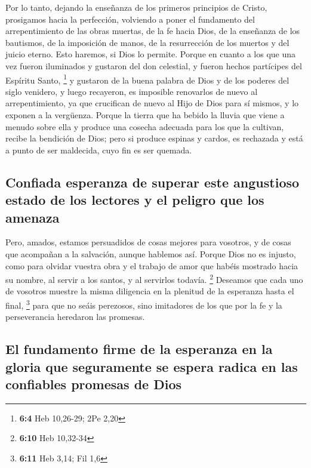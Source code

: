  Por lo tanto, dejando la enseñanza de los primeros
principios de Cristo, prosigamos hacia la perfección, volviendo a poner
el fundamento del arrepentimiento de las obras muertas, de la fe hacia
Dios,  de la enseñanza de los bautismos, de la imposición
de manos, de la resurrección de los muertos y del juicio eterno.
 Esto haremos, si Dios lo permite.  Porque
en cuanto a los que una vez fueron iluminados y gustaron del don
celestial, y fueron hechos partícipes del Espíritu Santo, \footnote{\textbf{6:4}
  Heb 10,26-29; 2Pe 2,20}  y gustaron de la buena palabra
de Dios y de los poderes del siglo venidero,  y luego
recayeron, es imposible renovarlos de nuevo al arrepentimiento, ya que
crucifican de nuevo al Hijo de Dios para sí mismos, y lo exponen a la
vergüenza.  Porque la tierra que ha bebido la lluvia que
viene a menudo sobre ella y produce una cosecha adecuada para los que la
cultivan, recibe la bendición de Dios;  pero si produce
espinas y cardos, es rechazada y está a punto de ser maldecida, cuyo fin
es ser quemada.

\hypertarget{confiada-esperanza-de-superar-este-angustioso-estado-de-los-lectores-y-el-peligro-que-los-amenaza}{%
\subsection{Confiada esperanza de superar este angustioso estado de los
lectores y el peligro que los
amenaza}\label{confiada-esperanza-de-superar-este-angustioso-estado-de-los-lectores-y-el-peligro-que-los-amenaza}}

 Pero, amados, estamos persuadidos de cosas mejores para
vosotros, y de cosas que acompañan a la salvación, aunque hablemos así.
 Porque Dios no es injusto, como para olvidar vuestra
obra y el trabajo de amor que habéis mostrado hacia su nombre, al servir
a los santos, y al servirlos todavía. \footnote{\textbf{6:10} Heb
  10,32-34}  Deseamos que cada uno de vosotros muestre la
misma diligencia en la plenitud de la esperanza hasta el final,
\footnote{\textbf{6:11} Heb 3,14; Fil 1,6}  para que no
seáis perezosos, sino imitadores de los que por la fe y la perseverancia
heredaron las promesas.

\hypertarget{el-fundamento-firme-de-la-esperanza-en-la-gloria-que-seguramente-se-espera-radica-en-las-confiables-promesas-de-dios}{%
\subsection{El fundamento firme de la esperanza en la gloria que
seguramente se espera radica en las confiables promesas de
Dios}\label{el-fundamento-firme-de-la-esperanza-en-la-gloria-que-seguramente-se-espera-radica-en-las-confiables-promesas-de-dios}}

